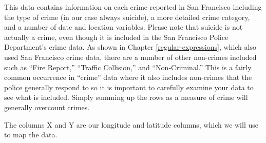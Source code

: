 \documentclass[
]{krantz}
\begin{document}
This data contains information on each crime reported in San
Francisco including the type of crime (in our case always
suicide), a more detailed crime category, and a number of
date and location variables. Please note that suicide is not
actually a crime, even though it is included in the San
Francisco Police Department's crime data. As shown in
Chapter \ref{regular-expressions}, which also used San
Francisco crime data, there are a number of other non-crimes
included such as ``Fire Report,'' ``Traffic Collision,'' and
``Non-Criminal.'' This is a fairly common occurrence in
``crime'' data where it also includes non-crimes that the
police generally respond to so it is important to carefully
examine your data to see what is included. Simply summing up
the rows as a measure of crime will generally overcount
crimes.

The columns X and Y are our longitude and latitude columns,
which we will use to map the data.
\end{document}
